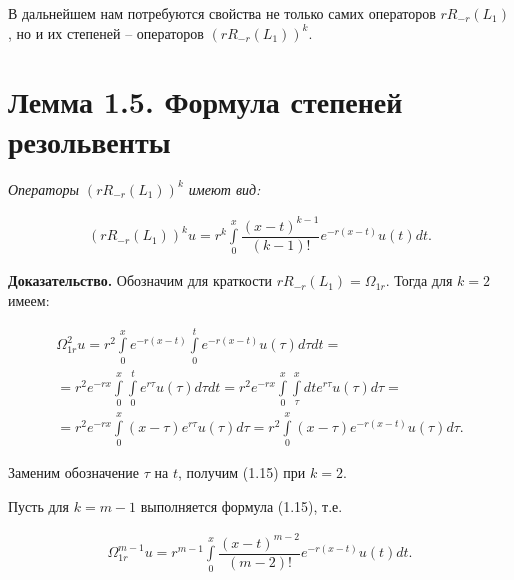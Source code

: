В дальнейшем нам потребуются свойства не только самих операторов $ rR_{-r}(L_1) $, но и их степеней – операторов $ (rR_{-r}(L_1))^k $.

\section{Лемма 1.5. Формула степеней резольвенты}
\label{lemma1.5}

\textit{Операторы $ (rR_{-r}(L_1))^k $ имеют вид:}

\begin{equation}
\begin{array}{c}

(rR_{-r}(L_1))^ku = r^k\int\limits_0^x \dfrac{(x-t)^{k-1}}{(k-1)!}e^{-r(x-t)}u(t)dt.

\end{array}
\end{equation}

\textbf{Доказательство.} Обозначим для краткости $ rR_{-r}(L_1) = \Omega_{1r} $. Тогда для $ k = 2 $ имеем:

\begin{equation}
\begin{array}{c}
\nonumber

\Omega_{1r}^2u = r^2\int\limits_0^x e^{-r(x-t)} \int\limits_0^t e^{-r(x-t)} u(\tau)d\tau dt = \\
= r^2e^{-rx}\int\limits_0^x\int\limits_0^t e^{r\tau}u(\tau)d\tau dt = r^2e^{-rx}\int\limits_0^x\int\limits_\tau^x dte^{r\tau}u(\tau)d\tau = \\
= r^2e^{-rx}\int\limits_0^x (x-\tau)e^{r\tau}u(\tau)d\tau = r^2\int\limits_0^x (x-\tau)e^{-r(x-t)}u(\tau)d\tau .

\end{array}
\end{equation}

Заменим обозначение $ \tau $ на $ t $, получим (1.15) при $ k = 2 $. 

Пусть для $ k = m - 1 $ выполняется формула (1.15), т.е.

\begin{equation}
\begin{array}{c}
\nonumber

\Omega_{1r}^{m-1}u = r^{m-1}\int\limits_0^x\dfrac{(x-t)^{m-2}}{(m-2)!}e^{-r(x-t)}u(t)dt.

\end{array}
\end{equation}

